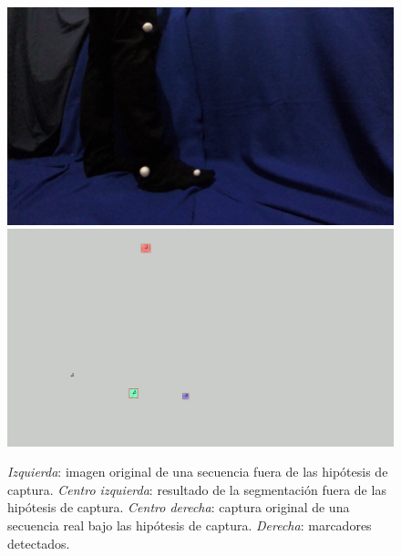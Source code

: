 \begin{figure}[ht!]
        {\includegraphics[scale=0.07]{imagenes/orig.png}\label{abelvideo2}}\hspace{1 mm}
        {\includegraphics[scale=0.07]{imagenes/detect.png}
        \label{abeldetect}}
      \caption{%
       \textit{Izquierda}: imagen original de una secuencia fuera de las hipótesis de captura. 
       \textit{Centro izquierda}: resultado de la segmentación fuera de las hipótesis de captura.
       \textit{Centro derecha}: captura original de una secuencia real bajo las hipótesis de captura.
       \textit{Derecha}: marcadores detectados.}  
      \label{ejemploabelumbr2}
\end{figure}
